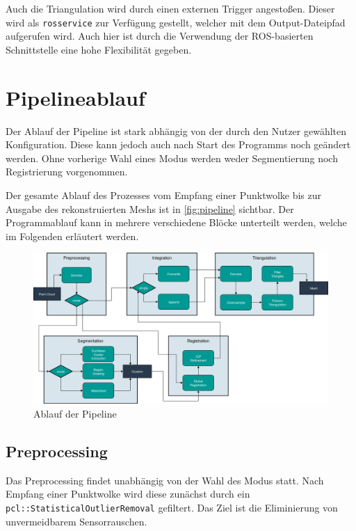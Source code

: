 Auch die Triangulation wird durch einen externen Trigger angestoßen.
Dieser wird als \texttt{rosservice} zur Verfügung gestellt, welcher mit dem Output-Dateipfad aufgerufen wird.
Auch hier ist durch die Verwendung der \ac{ROS}-basierten Schnittstelle eine hohe Flexibilität gegeben.


\section{Pipelineablauf}
\label{sec:pipeline}

Der Ablauf der Pipeline ist stark abhängig von der durch den Nutzer gewählten Konfiguration.
Diese kann jedoch auch nach Start des Programms noch geändert werden.
Ohne vorherige Wahl eines Modus werden weder Segmentierung noch Registrierung vorgenommen.

Der gesamte Ablauf des Prozesses vom Empfang einer Punktwolke bis zur Ausgabe des rekonstruierten Meshs ist in \autoref{fig:pipeline} sichtbar.
Der Programmablauf kann in mehrere verschiedene Blöcke unterteilt werden, welche im Folgenden erläutert werden.

\begin{figure}[ht]
    \centering
	\includegraphics[width=\textwidth]{images/pipeline.png}
	\caption{Ablauf der Pipeline}
	\label{fig:pipeline}
\end{figure}


\subsection{Preprocessing}
\label{subsec:pipeline-preprocessing}

Das Preprocessing findet unabhängig von der Wahl des Modus statt.
Nach Empfang einer Punktwolke wird diese zunächst durch ein \texttt{pcl::StatisticalOutlierRemoval} gefiltert.
Das Ziel ist die Eliminierung von unvermeidbarem Sensorrauschen.

